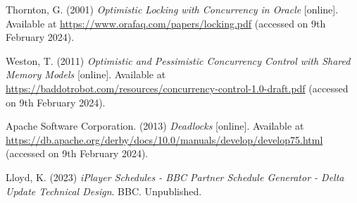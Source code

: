 \noindent Thornton, G. (2001) \textit{Optimistic Locking with Concurrency in Oracle} [online]. Available at \url{https://www.orafaq.com/papers/locking.pdf} (accessed on 9th February 2024).
\vspace{0.2cm}

\noindent Weston, T. (2011) \textit{Optimistic and Pessimistic Concurrency Control with Shared Memory Models} [online]. Available at \url{https://baddotrobot.com/resources/concurrency-control-1.0-draft.pdf} (accessed on 9th February 2024).
\vspace{0.2cm}

\noindent Apache Software Corporation. (2013) \textit{Deadlocks} [online]. Available at \url{https://db.apache.org/derby/docs/10.0/manuals/develop/develop75.html} (accessed on 9th February 2024).
\vspace{0.2cm}

\noindent Lloyd, K. (2023) \textit{iPlayer Schedules - BBC Partner Schedule Generator - Delta Update Technical Design}. BBC. Unpublished.
\vspace{0.2cm}

\newpage
